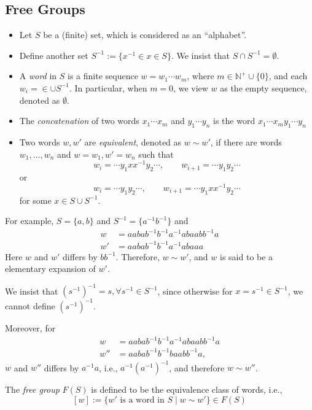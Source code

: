 \subsection{Free Groups}
\begin{definition}
\begin{itemize}
\item
Let $S$ be a (finite) set, which is considered as an ``alphabet''.
\item
Define another set $S^{-1}:=\{x^{-1}\in x\in S\}$. We insist that $S\cap S^{-1}=\emptyset$.
\item
A \emph{word} in $S$ is a finite sequence $w=w_1\cdots w_m$,
where $m\in\mathbb{N}^+\cup\{0\}$, and each $w_i=\in \cup S^{-1}$.
In particular, when $m=0$, we view $w$ as the empty sequence, denoted as $\emptyset$.
\item
The \emph{concatenation} of two words $x_1\cdots x_m$ and $y_1\cdots y_n$ is the word $x_1\cdots x_my_1\cdots y_n$
\item
Two words $w,w'$ are \emph{equivalent}, denoted as $w\sim w'$, if there are words $w_1,\dots,w_n$ and $w=w_1,w'=w_n $ such that
\[
w_i = \cdots y_1xx^{-1}y_2\cdots,\qquad
w_{i+1}=\cdots y_1y_2\cdots
\]
or
\[
w_{i}=\cdots y_1y_2\cdots,\qquad
w_{i+1}=\cdots y_1xx^{-1}y_2\cdots
\]
for some $x\in S\cup S^{-1}$.
\end{itemize}
\end{definition}
\begin{example}
For example, $S=\{a,b\}$ and $S^{-1}=\{a^{-1}b^{-1}\}$ and 
\begin{align*}
w&=aabab^{-1}b^{-1}a^{-1}abaabb^{-1}a\\
w'&=aabab^{-1}b^{-1}a^{-1}abaaa
\end{align*}
Here $w$ and $w'$ differs by $bb^{-1}$. Therefore, $w\sim w'$, and $w$ is said to be a elementary expansion of $w'$.
\end{example}
\begin{remark}
We insist that $(s^{-1})^{-1}=s,\forall s^{-1}\in S^{-1}$,
since otherwise for $x=s^{-1}\in S^{-1}$, we cannot define $(s^{-1})^{-1}$.

Moreover, for 
\begin{align*}
w&=aabab^{-1}b^{-1}a^{-1}abaabb^{-1}a\\
w''&=aabab^{-1}b^{-1}baabb^{-1}a,
\end{align*}
$w$ and $w''$ differs by $a^{-1}a$, i.e., $a^{-1}(a^{-1})^{-1}$, and therefore $w\sim w''$.
\end{remark}
\begin{definition}
The \emph{free group} $F(S)$ is defined to be the equivalence class of words, i.e., 
\[
[w]:=\{\text{$w'$ is a word in $S$}\mid w\sim w'\}\in F(S)
\]
\end{definition}

